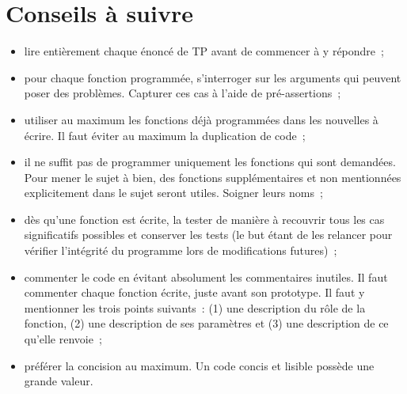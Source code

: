 \documentclass[12pt]{article}
\theoremstyle{definition}
\begin{document}
\section{Conseils à suivre}
\begin{itemize}
    \item lire entièrement chaque énoncé de TP avant de commencer à y
    répondre~;
    \smallskip
    
    \item pour chaque fonction programmée, s'interroger sur les arguments
    qui peuvent poser des problèmes. Capturer ces cas à l'aide de
    pré-assertions~;
    \smallskip
    
    \item utiliser au maximum les fonctions déjà programmées dans les
    nouvelles à écrire. Il faut éviter au maximum la duplication de code~;
    \smallskip
    
    \item il ne suffit pas de programmer uniquement les fonctions qui sont
    demandées. Pour mener le sujet à bien, des fonctions supplémentaires
    et non mentionnées explicitement dans le sujet seront utiles. Soigner
    leurs noms~;
    \smallskip
    
    \item dès qu'une fonction est écrite, la tester de manière à
    recouvrir tous les cas significatifs possibles et conserver les tests
    (le but étant de les relancer pour vérifier l'intégrité du
    programme lors de modifications futures)~;
    \smallskip
    
    \item commenter le code en évitant absolument les commentaires inutiles.
    Il faut commenter chaque fonction écrite, juste avant son prototype.
    Il faut y mentionner les trois points suivants~: (1) une description
    du rôle de la fonction, (2) une description de ses paramètres et (3)
    une description de ce qu'elle renvoie~;
    \smallskip
    
    \item préférer la concision au maximum. Un code concis et lisible
    possède une grande valeur.
\end{itemize}
\end{document}
